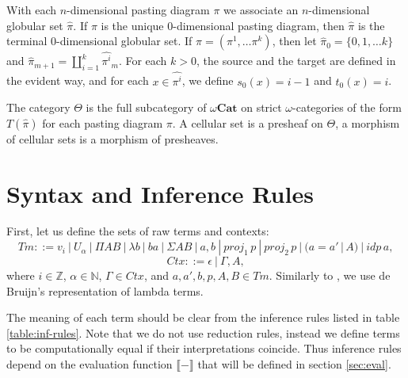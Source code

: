 \documentclass{amsart}
\theoremstyle{definition}
\theoremstyle{remark}
\newcommand{\cat}[1]{\mathbf{#1}}
\newcommand{\nats}{\mathbb{N}}
\newcommand{\Z}{\mathbb{Z}}
\newcommand{\ocat}{\omega \cat{Cat}}
\numberwithin{table}{section}
\begin{document}
With each $n$-dimensional pasting diagram $\pi$ we associate an $n$-dimensional globular set $\widehat{\pi}$.
If $\pi$ is the unique $0$-dimensional pasting diagram, then $\widehat{\pi}$ is the terminal $0$-dimensional globular set.
If $\pi = (\pi^1, \ldots \pi^k)$, then let $\widehat{\pi}_0 = \{0, 1, \ldots k\}$
and $\widehat{\pi}_{m+1} = \coprod \limits_{i = 1}^k \widehat{\pi^i}_m$.
For each $k > 0$, the source and the target are defined in the evident way,
and for each $x \in \widehat{\pi^i}$, we define $s_0(x) = i - 1$ and $t_0(x) = i$.

\begin{defn}
The category $\Theta$ is the full subcategory of $\ocat$ on strict $\omega$-categories of the form $T(\widehat{\pi})$ for each pasting diagram $\pi$.
A cellular set is a presheaf on $\Theta$, a morphism of cellular sets is a morphism of presheaves.
\end{defn}

\section{Syntax and Inference Rules}

First, let us define the sets of raw terms and contexts:
\[ Tm ::= v_i\ |\ U_\alpha\ |\ \Pi A B\ |\ \lambda b\ |\ b a\ |\ \Sigma A B\ |\ a , b\ |\ proj_1\,p\ |\ proj_2\,p\ |\ (a = a'\,|\,A)\ |\ idp\,a, \]
\[ Ctx ::= \epsilon\ |\ \Gamma, A, \]
where $i \in \Z$, $\alpha \in \nats$, $\Gamma \in Ctx$, and $a, a', b, p, A, B \in Tm$.
Similarly to \cite{norm}, we use de Bruijn's representation of lambda terms.

The meaning of each term should be clear from the inference rules listed in table \ref{table:inf-rules}.
Note that we do not use reduction rules, instead we define terms to be computationally equal if their interpretations coincide.
Thus inference rules depend on the evaluation function $\llbracket - \rrbracket$ that will be defined in section \ref{sec:eval}.

\centerAlignProof
\end{document}
